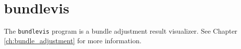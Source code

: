 
\section{bundlevis}
\label{bundlevis}

The \texttt{bundlevis} program is a bundle adjustment result
visualizer.  See Chapter \ref{ch:bundle_adjustment} for more
information.

